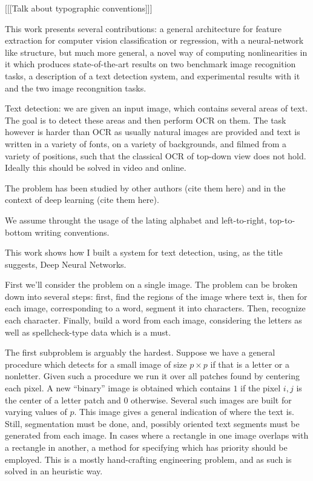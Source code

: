 \documentclass[12pt,a4paper,oneside,english]{UPBThesis}
\newcommand{\hctimes}[2]{{#1}\!\times\!{#2}}
\begin{document}
[[[Talk about typographic conventions]]]

This work presents several contributions: a general architecture for feature extraction for computer vision classification or regression, with a neural-network like structure, but much more general, a novel way of computing nonlinearities in it which produces state-of-the-art results on two benchmark image recognition tasks, a description of a text detection system, and experimental results with it and the two image recongnition tasks.

Text detection: we are given an input image, which contains several areas of text. The goal is to detect these areas and then perform OCR on them. The task however is harder than OCR as usually natural images are provided and text is written in a variety of fonts, on a variety of backgrounds, and filmed from a variety of positions, such that the classical OCR of top-down view does not hold. Ideally this should be solved in video and online.

The problem has been studied by other authors (cite them here) and in the context of deep learning (cite them here).

We assume throught the usage of the lating alphabet and left-to-right, top-to-bottom writing conventions.

This work shows how I built a system for text detection, using, as the title suggests, Deep Neural Networks.

First we'll consider the problem on a single image. The problem can be broken down into several steps: first, find the regions of the image where text is, then for each image, corresponding to a word, segment it into characters. Then, recognize each character. Finally, build a word from each image, considering the letters as well as spellcheck-type data which is a must.

The first subproblem is arguably the hardest. Suppose we have a general procedure which detects for a small image of size $\hctimes{p}{p}$ if that is a letter or a nonletter. Given such a procedure we run it over all patches found by centering each pixel. A new ``binary'' image is obtained which contains $1$ if the pixel $i,j$ is the center of a letter patch and $0$ otherwise. Several such images are built for varying values of $p$. This image gives a general indication of where the text is. Still, segmentation must be done, and, possibly oriented text segments must be generated from each image. In cases where a rectangle in one image overlaps with a rectangle in another, a method for specifying which has priority should be employed. This is a mostly hand-crafting engineering problem, and as such is solved in an heuristic way.
\end{document}
